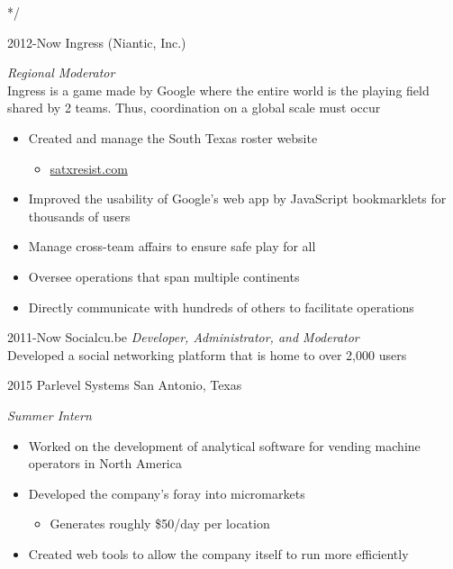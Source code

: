 \documentclass[]{friggeri-cv} %
\begin{document}
*/ 


\begin{entrylist}
	
	\entry
	{2012-Now}
	{Ingress (Niantic, Inc.)}
	{}
	{\emph{Regional Moderator} \\ 
		Ingress is a game made by Google where the entire world is the playing field shared by 2 teams. Thus, coordination on a global scale must occur 
		\begin{itemize}
			\item Created and manage the South Texas roster website 
			\begin{itemize}
				\item \href{http://satxresist.com}{satxresist.com}
			\end{itemize}
			\item Improved the usability of Google's web app by JavaScript bookmarklets for thousands of users 
			\item Manage cross-team affairs to ensure safe play for all 
			\item Oversee operations that span multiple continents 
			\item Directly communicate with hundreds of others to facilitate operations 
		\end{itemize}
	}
	
	
	\entry
	{2011-Now}
	{Socialcu.be}
	{}
	{\emph{Developer, Administrator, and Moderator} \\
		Developed a social networking platform that is home to over 2,000 users}
	
	
	\entry
	{2015}
	{Parlevel Systems}
	{San Antonio, Texas}
	{\emph{Summer Intern} 
		\begin{itemize}
			\item Worked on the development of analytical software for vending machine operators in North America 
			\item Developed the company's foray into micromarkets 
			\begin{itemize}
				\item Generates roughly \$50/day per location 
			\end{itemize}
			\item Created web tools to allow the company itself to run more efficiently
		\end{itemize}
	}
	

\end{entrylist}
\end{document}
